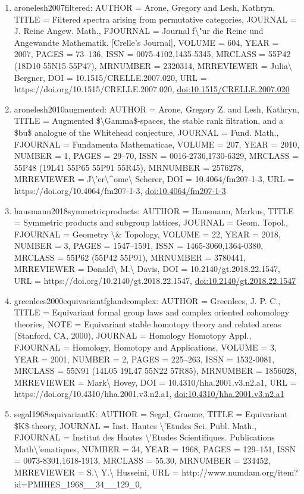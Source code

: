 \documentclass[11pt]{article}
\begin{document}
\begin{enumerate}[leftmargin=*]
  \item aronelesh2007filtered: AUTHOR = Arone, Gregory and Lesh, Kathryn, TITLE = Filtered spectra arising from permutative categories, JOURNAL = J. Reine Angew. Math., FJOURNAL = Journal f\textbackslash{}"ur die Reine und Angewandte Mathematik. [Crelle's Journal], VOLUME = 604, YEAR = 2007, PAGES = 73--136, ISSN = 0075-4102,1435-5345, MRCLASS = 55P42 (18D10 55N15 55P47), MRNUMBER = 2320314, MRREVIEWER = Julia\textbackslash{} Bergner, DOI = 10.1515/CRELLE.2007.020, URL = https://doi.org/10.1515/CRELLE.2007.020, \href{https://doi.org/10.1515/CRELLE.2007.020}{doi:10.1515/CRELLE.2007.020}
  \item aronelesh2010augmented: AUTHOR = Arone, Gregory Z. and Lesh, Kathryn, TITLE = Augmented \$\textbackslash{}Gamma\$-spaces, the stable rank filtration, and a \$bu\$ analogue of the Whitehead conjecture, JOURNAL = Fund. Math., FJOURNAL = Fundamenta Mathematicae, VOLUME = 207, YEAR = 2010, NUMBER = 1, PAGES = 29--70, ISSN = 0016-2736,1730-6329, MRCLASS = 55P48 (19L41 55P65 55P91 55R45), MRNUMBER = 2576278, MRREVIEWER = J\textbackslash{}'er\textbackslash{}\^{}ome\textbackslash{} Scherer, DOI = 10.4064/fm207-1-3, URL = https://doi.org/10.4064/fm207-1-3, \href{https://doi.org/10.4064/fm207-1-3}{doi:10.4064/fm207-1-3}
  \item hausmann2018symmetricproducts: AUTHOR = Hausmann, Markus, TITLE = Symmetric products and subgroup lattices, JOURNAL = Geom. Topol., FJOURNAL = Geometry \textbackslash{}\& Topology, VOLUME = 22, YEAR = 2018, NUMBER = 3, PAGES = 1547--1591, ISSN = 1465-3060,1364-0380, MRCLASS = 55P62 (55P42 55P91), MRNUMBER = 3780441, MRREVIEWER = Donald\textbackslash{} M.\textbackslash{} Davis, DOI = 10.2140/gt.2018.22.1547, URL = https://doi.org/10.2140/gt.2018.22.1547, \href{https://doi.org/10.2140/gt.2018.22.1547}{doi:10.2140/gt.2018.22.1547}
  \item greenlees2000equivariantfglandcomplex: AUTHOR = Greenlees, J. P. C., TITLE = Equivariant formal group laws and complex oriented cohomology theories, NOTE = Equivariant stable homotopy theory and related areas (Stanford, CA, 2000), JOURNAL = Homology Homotopy Appl., FJOURNAL = Homology, Homotopy and Applications, VOLUME = 3, YEAR = 2001, NUMBER = 2, PAGES = 225--263, ISSN = 1532-0081, MRCLASS = 55N91 (14L05 19L47 55N22 57R85), MRNUMBER = 1856028, MRREVIEWER = Mark\textbackslash{} Hovey, DOI = 10.4310/hha.2001.v3.n2.a1, URL = https://doi.org/10.4310/hha.2001.v3.n2.a1, \href{https://doi.org/10.4310/hha.2001.v3.n2.a1}{doi:10.4310/hha.2001.v3.n2.a1}
  \item segal1968equivariantK: AUTHOR = Segal, Graeme, TITLE = Equivariant \$K\$-theory, JOURNAL = Inst. Hautes \textbackslash{}'Etudes Sci. Publ. Math., FJOURNAL = Institut des Hautes \textbackslash{}'Etudes Scientifiques. Publications Math\textbackslash{}'ematiques, NUMBER = 34, YEAR = 1968, PAGES = 129--151, ISSN = 0073-8301,1618-1913, MRCLASS = 55.30, MRNUMBER = 234452, MRREVIEWER = S.\textbackslash{} Y.\textbackslash{} Husseini, URL = http://www.numdam.org/item?id=PMIHES\_1968\_\_34\_\_129\_0,

\end{enumerate}
\end{document}
